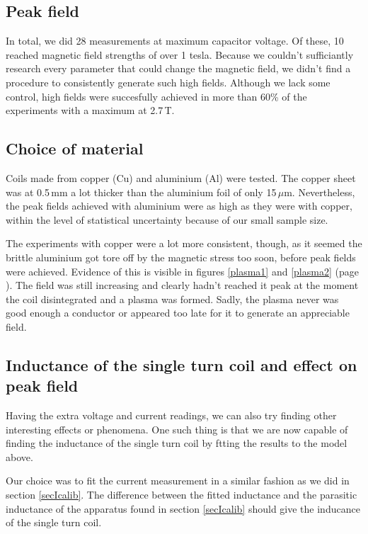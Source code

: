 

\subsection{Peak field}

In total, we did 28 measurements at maximum capacitor voltage. Of these, 10 
reached magnetic field strengths of over 1 tesla. Because we couldn't 
sufficiantly research every parameter that could change the magnetic field, 
we didn't find a procedure to consistently generate such high fields.  
Although we lack some control, high fields were succesfully achieved in 
more than 60\% of the experiments with a maximum at 2.7\,T.


\subsection{Choice of material}

Coils made from copper (Cu) and aluminium (Al) were tested. The copper sheet 
was at 0.5\,mm a lot thicker than the aluminium foil of only 15\,$\mu$m.  
Nevertheless, the peak fields achieved with aluminium were as high as they 
were with copper, within the level of statistical uncertainty because of 
our small sample size.

The experiments with copper were a lot more consistent, though, as it 
seemed the brittle aluminium got tore off by the magnetic stress too soon, 
before peak fields were achieved. Evidence of this is visible in figures 
\ref{plasma1} and \ref{plasma2} (page \pageref{plasma1}). The field was 
still increasing and clearly hadn't reached it peak at the moment the coil 
disintegrated and a plasma was formed. Sadly, the plasma never was good 
enough a conductor or appeared too late for it to generate an appreciable 
field.


\subsection{Inductance of the single turn coil and effect on peak 
field\label{secCoilInductance}}

Having the extra voltage and current readings, we can also try finding 
other interesting effects or phenomena. One such thing is that we are now 
capable of finding the inductance of the single turn coil by ftting the 
results to the model above.

Our choice was to fit the current measurement in a similar fashion as we 
did in section \ref{secIcalib}. The difference between the fitted 
inductance and the parasitic inductance of the apparatus found in section 
\ref{secIcalib} should give the inducance of the single turn coil.

